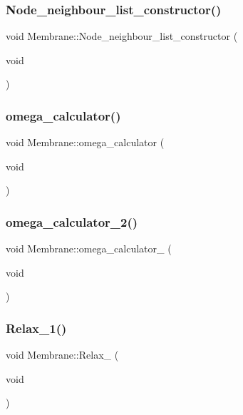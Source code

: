 \subsubsection{\texorpdfstring{Node\_neighbour\_list\_constructor()}{Node\_neighbour\_list\_constructor()}}
{\footnotesize\ttfamily void Membrane\+::\+Node\+\_\+neighbour\+\_\+list\+\_\+constructor (\begin{DoxyParamCaption}\item[{void}]{ }\end{DoxyParamCaption})}

\mbox{\label{classMembrane_a72796df96d3748c43543f10b85d26145}} 
\subsubsection{\texorpdfstring{omega\_calculator()}{omega\_calculator()}}
{\footnotesize\ttfamily void Membrane\+::omega\+\_\+calculator (\begin{DoxyParamCaption}\item[{void}]{ }\end{DoxyParamCaption})}

\mbox{\label{classMembrane_a2877e319db184da4fb5294d372400fa0}} 
\subsubsection{\texorpdfstring{omega\_calculator\_2()}{omega\_calculator\_2()}}
{\footnotesize\ttfamily void Membrane\+::omega\+\_\+calculator\+\_ (\begin{DoxyParamCaption}\item[{void}]{ }\end{DoxyParamCaption})}

\mbox{\label{classMembrane_a61d5561da6e815e1b75ac971121fdd28}} 
\subsubsection{\texorpdfstring{Relax\_1()}{Relax\_1()}}
{\footnotesize\ttfamily void Membrane\+::\+Relax\+\_ (\begin{DoxyParamCaption}\item[{void}]{ }\end{DoxyParamCaption})}

